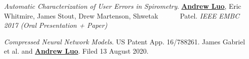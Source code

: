 \begin{cventries}
  \vspace{-1.5em}
  \cventry
    {}
    {}
    {}
    {}
    {\textit{Automatic Characterization of User Errors in Spirometry}. \underline{\textbf{Andrew Luo}}, Eric Whitmire,
 James Stout, Drew Martenson, Shwetak \textcolor{white}{aaaaa} Patel. \textit{IEEE} \textit{EMBC 2017 (Oral Presentation + Paper)}}
\vspace{-1em}
\end{cventries}
\begin{cventries}
  \vspace{-0.5em}
  \cventry
    {}
    {}
    {}
    {}
    {\textit{Compressed Neural Network Models}. US Patent App. 16/788261. James Gabriel et al. and \underline{\textbf{Andrew Luo}}. Filed 13 August 2020.}
\end{cventries}
